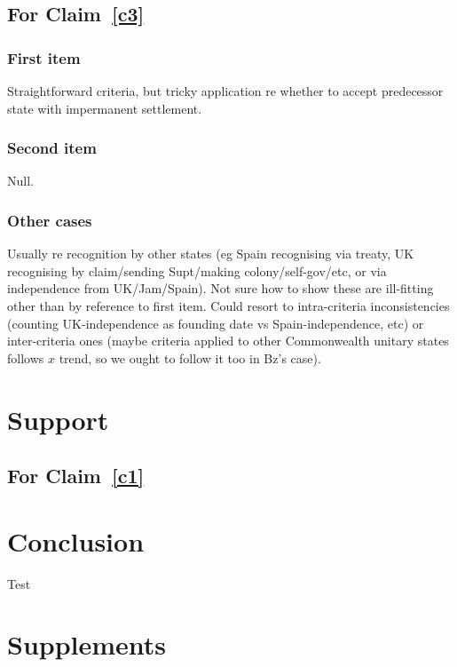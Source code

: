 \documentclass{amsart}
\theoremstyle{definition}%
\theoremstyle{definition}%
\begin{document}
\subsection{For Claim~\ref{c3}}
\subsubsection{First item} Straightforward criteria, but tricky application re whether to accept predecessor state with impermanent settlement.
\subsubsection{Second item} Null.
\subsubsection{Other cases} Usually re recognition by other states (eg Spain recognising via treaty, UK recognising by claim/sending Supt/making colony/self-gov/etc, or via independence from UK/Jam/Spain). Not sure how to show these are ill-fitting other than by reference to first item. Could resort to intra-criteria inconsistencies (counting UK-independence as founding date vs Spain-independence, etc) or inter-criteria ones (maybe criteria applied to other Commonwealth unitary states follows \(x\) trend, so we ought to follow it too in Bz's case).
%
%
%
%
\section{Support}
\label{s:support}
\subsection{For Claim~\ref{c1}}
%
%
%
%
\section{Conclusion}
\label{s:concl}
\lipsum[1][1-6] Test~\cite{han15}
%
%
%
% 
\begin{bibdiv}
\label{s:refs}
\begin{biblist}
\end{biblist}
\end{bibdiv}
%
%
%
%
\newpage%
\appendix \section{Supplements}
\label{app}
\lipsum[1][1-6]
%
%
%
%
\end{document}
